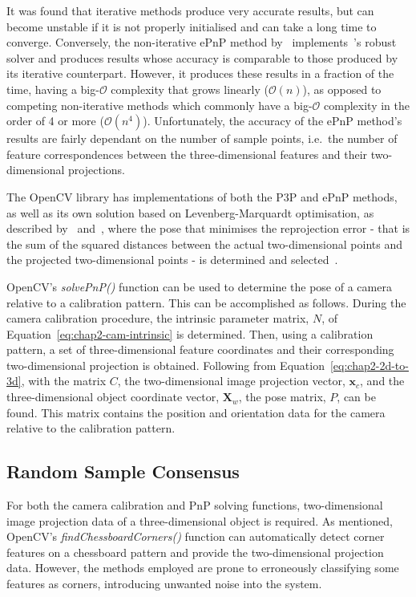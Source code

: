 It was found that iterative methods produce very accurate results, but can become unstable if it is not properly initialised and can take a long time to converge. Conversely, the non-iterative ePnP method by~\citeauthor{lepetit2009epnp} implements~\citeauthor{schweighofer2006robust}'s robust solver and produces results whose accuracy is comparable to those produced by its iterative counterpart. However, it produces these results in a fraction of the time, having a big-$\mathcal{O}$ complexity that grows linearly ($\mathcal{O}(n)$), as opposed to competing non-iterative methods which commonly have a big-$\mathcal{O}$ complexity in the order of 4 or more ($\mathcal{O}(n^4)$). Unfortunately, the accuracy of the ePnP method's results are fairly dependant on the number of sample points, i.e.\ the number of feature correspondences between the three-dimensional features and their two-dimensional projections. 

The OpenCV library has implementations of both the P3P and ePnP methods, as well as its own solution based on Levenberg-Marquardt optimisation, as described by~\cite{levenberg1944method} and~\cite{marquardt1963algorithm}, where the pose that minimises the reprojection error - that is the sum of the squared distances between the actual two-dimensional points and the projected two-dimensional points - is determined and selected~\citep{opencv-levenberg}. 

OpenCV's \emph{solvePnP()} function can be used to determine the pose of a camera relative to a calibration pattern. This can be accomplished as follows. During the camera calibration procedure, the intrinsic parameter matrix, $N$, of Equation~\ref{eq:chap2-cam-intrinsic} is determined. Then, using a calibration pattern, a set of three-dimensional feature coordinates and their corresponding two-dimensional projection is obtained. Following from Equation~\ref{eq:chap2-2d-to-3d}, with the matrix $C$, the two-dimensional image projection vector, $\bm{x}_c$, and the three-dimensional object coordinate vector, $\bm{X}_w$, the pose matrix, $P$, can be found. This matrix contains the position and orientation data for the camera relative to the calibration pattern. 

\subsection{Random Sample Consensus}

For both the camera calibration and PnP solving functions, two-dimensional image projection data of a three-dimensional object is required. As mentioned, OpenCV's \emph{findChessboardCorners()} function can automatically detect corner features on a chessboard pattern and provide the two-dimensional projection data. However, the methods employed are prone to erroneously classifying some features as corners, introducing unwanted noise into the system. 


